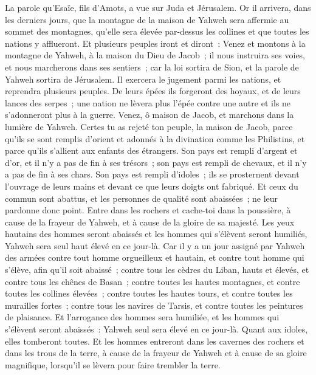 \begin{multicols}{2}
\VerseOne{}La parole qu'Esaïe, fils d'Amots, a vue sur Juda et Jérusalem.
Or il arrivera, dans les derniers jours, que la montagne de la maison de Yahweh sera affermie au sommet des montagnes, qu'elle sera élevée par-dessus les collines et que toutes les nations y afflueront.
Et plusieurs peuples iront et diront~: Venez et montons à la montagne de Yahweh, à la maison du Dieu de Jacob~; il nous instruira ses voies, et nous marcherons dans ses sentiers~; car la loi sortira de Sion, et la parole de Yahweh sortira de Jérusalem.
Il exercera le jugement parmi les nations, et reprendra plusieurs peuples. De leurs épées ils forgeront des hoyaux, et de leurs lances des serpes~; une nation ne lèvera plus l'épée contre une autre et ils ne s'adonneront plus à la guerre.
Venez, ô maison de Jacob, et marchons dans la lumière de Yahweh.
Certes tu as rejeté ton peuple, la maison de Jacob, parce qu'ils se sont remplis d'orient et adonnés à la divination comme les Philistins, et parce qu'ils s'allient aux enfants des étrangers.
Son pays est rempli d'argent et d'or, et il n'y a pas de fin à ses trésors~; son pays est rempli de chevaux, et il n'y a pas de fin à ses chars.
Son pays est rempli d'idoles~; ils se prosternent devant l'ouvrage de leurs mains et devant ce que leurs doigts ont fabriqué.
Et ceux du commun sont abattus, et les personnes de qualité sont abaissées~; ne leur pardonne donc point.
Entre dans les rochers et cache-toi dans la poussière, à cause de la frayeur de Yahweh, et à cause de la gloire de sa majesté.
Les yeux hautains des hommes seront abaissés et les hommes qui s'élèvent seront humiliés, Yahweh sera seul haut élevé en ce jour-là.
Car il y a un jour assigné par Yahweh des armées contre tout homme orgueilleux et hautain, et contre tout homme qui s'élève, afin qu'il soit abaissé~;
contre tous les cèdres du Liban, hauts et élevés, et contre tous les chênes de Basan~;
contre toutes les hautes montagnes, et contre toutes les collines élevées~;
contre toutes les hautes tours, et contre toutes les murailles fortes~;
contre tous les navires de Tarsis, et contre toutes les peintures de plaisance.
Et l'arrogance des hommes sera humiliée, et les hommes qui s'élèvent seront abaissés~:
Yahweh seul sera élevé en ce jour-là. Quant aux idoles, elles tomberont toutes.
Et les hommes entreront dans les cavernes des rochers et dans les trous de la terre, à cause de la frayeur de Yahweh et à cause de sa gloire magnifique, lorsqu'il se lèvera pour faire trembler la terre.

\end{multicols}
